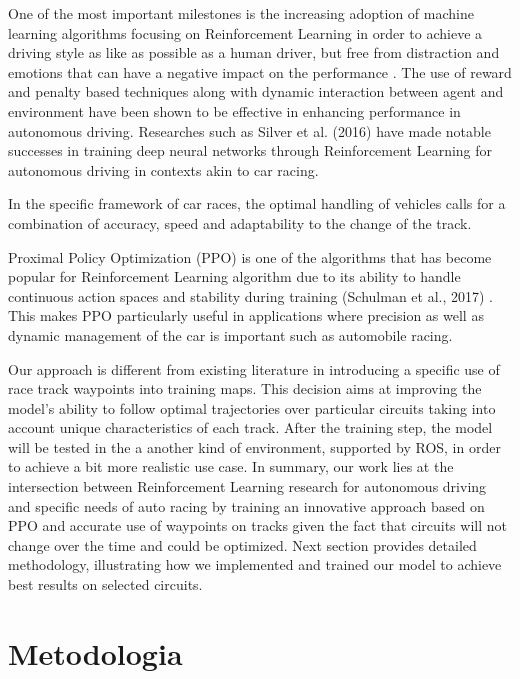 \documentclass[conference]{IEEEtran}
\begin{document}
One of the most important milestones is the increasing adoption of machine learning algorithms focusing on Reinforcement Learning in order to achieve a driving style as like as possible as a human driver, but free from distraction and emotions that can have a negative impact on the performance \cite{andru}.
%
The use of reward and penalty based techniques along with dynamic interaction between agent and environment have been shown to be effective in enhancing performance in autonomous driving.
%
Researches such as Silver et al. (2016) \cite{GO_DNN} have made notable successes in training deep neural networks through Reinforcement Learning for autonomous driving in contexts akin to car racing.

In the specific framework of car races, the optimal handling of vehicles calls for a combination of accuracy, speed and adaptability to the change of the track.

Proximal Policy Optimization (PPO) is one of the algorithms that has become popular for Reinforcement Learning algorithm due to its ability to handle continuous action spaces and stability during training (Schulman et al., 2017) \cite{PPOOpenAI}.
%
This makes PPO particularly useful in applications where precision as well as dynamic management of the car is important such as automobile racing.

Our approach is different from existing literature in introducing a specific use of race track waypoints into training maps.
%
This decision aims at improving the model’s ability to follow optimal trajectories over particular circuits taking into account unique characteristics of each track.
%
After the training step, the model will be tested in the a another kind of environment, supported by ROS, in order to achieve a bit more realistic use case.
%
In summary, our work lies at the intersection between Reinforcement Learning research for autonomous driving and specific needs of auto racing by training an innovative approach based on PPO and accurate use of waypoints on tracks given the fact that circuits will not change over the time and could be optimized.
%
Next section provides detailed methodology, illustrating how we implemented and trained our model to achieve best results on selected circuits.

\section{Metodologia}

\end{document}
